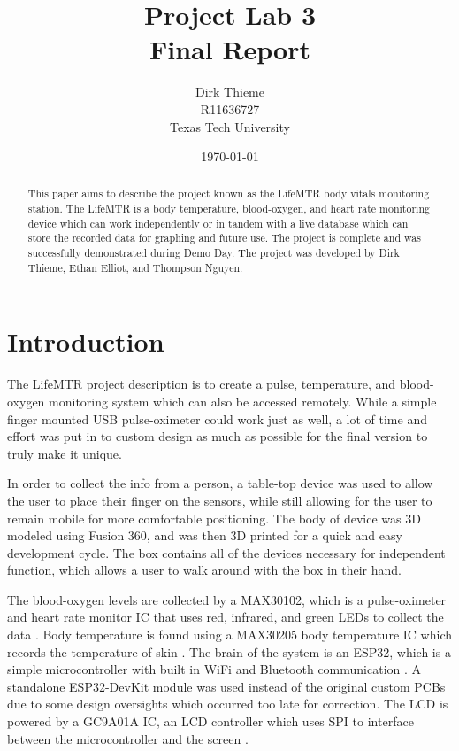 \documentclass[12pt]{article}
\title{Project Lab 3\\\large Final Report}
\author{Dirk Thieme\\R11636727\\Texas Tech University}
\date{\today}
\begin{document}
\maketitle %
\newpage
{} %

\begin{abstract}
    This paper aims to describe the project known as the LifeMTR body vitals monitoring station. The LifeMTR is a body temperature, blood-oxygen, and heart rate monitoring device which can work independently or in tandem with a live database which can store the recorded data for graphing and future use. The project is complete and was successfully demonstrated during Demo Day. The project was developed by Dirk Thieme, Ethan Elliot, and Thompson Nguyen.
\end{abstract}

\newpage
\tableofcontents

\newpage
\listoffigures

\newpage
\section{Introduction}
    The LifeMTR project description is to create a pulse, temperature, and blood-oxygen monitoring system which can also be accessed remotely. While a simple finger mounted USB pulse-oximeter could work just as well, a lot of time and effort was put in to custom design as much as possible for the final version to truly make it unique.
    
    In order to collect the info from a person, a table-top device was used to allow the user to place their finger on the sensors, while still allowing for the user to remain mobile for more comfortable positioning. The body of device was 3D modeled using Fusion 360, and was then 3D printed for a quick and easy development cycle. The box contains all of the devices necessary for independent function, which allows a user to walk around with the box in their hand.
    
    The blood-oxygen levels are collected by a MAX30102, which is a pulse-oximeter and heart rate monitor IC that uses red, infrared, and green LEDs to collect the data \cite{max30102}. Body temperature is found using a MAX30205 body temperature IC which records the temperature of skin \cite{max30205}. The brain of the system is an ESP32, which is a simple microcontroller with built in WiFi and Bluetooth communication \cite{esp32}. A standalone ESP32-DevKit module was used instead of the original custom PCBs due to some design oversights which occurred too late for correction. The LCD is powered by a GC9A01A IC, an LCD controller which uses SPI to interface between the microcontroller and the screen \cite{gc9a01a}.
    
\end{document}
